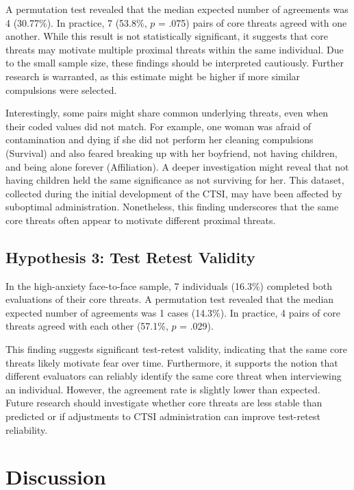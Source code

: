 \documentclass[
  man,floatsintext]{apa7}
\begin{document}
A permutation test revealed that the median expected number of agreements was 4 (30.77\%).
In practice, 7 (53.8\%, \(p\) = .075) pairs of core threats agreed with one another.
While this result is not statistically significant, it suggests that core threats may motivate multiple proximal threats within the same individual.
Due to the small sample size, these findings should be interpreted cautiously.
Further research is warranted, as this estimate might be higher if more similar compulsions were selected.

Interestingly, some pairs might share common underlying threats, even when their coded values did not match.
For example, one woman was afraid of contamination and dying if she did not perform her cleaning compulsions (Survival) and also feared breaking up with her boyfriend, not having children, and being alone forever (Affiliation).
A deeper investigation might reveal that not having children held the same significance as not surviving for her.
This dataset, collected during the initial development of the CTSI, may have been affected by suboptimal administration.
Nonetheless, this finding underscores that the same core threats often appear to motivate different proximal threats.

\subsection{Hypothesis 3: Test Retest Validity}\label{hypothesis-3-test-retest-validity}

In the high-anxiety face-to-face sample, 7 individuals (16.3\%) completed both evaluations of their core threats.
A permutation test revealed that the median expected number of agreements was 1 cases (14.3\%).
In practice, 4 pairs of core threats agreed with each other (57.1\%, \(p\) = .029).

This finding suggests significant test-retest validity, indicating that the same core threats likely motivate fear over time.
Furthermore, it supports the notion that different evaluators can reliably identify the same core threat when interviewing an individual.
However, the agreement rate is slightly lower than expected.
Future research should investigate whether core threats are less stable than predicted or if adjustments to CTSI administration can improve test-retest reliability.

\section{Discussion}\label{discussion}
\end{document}
